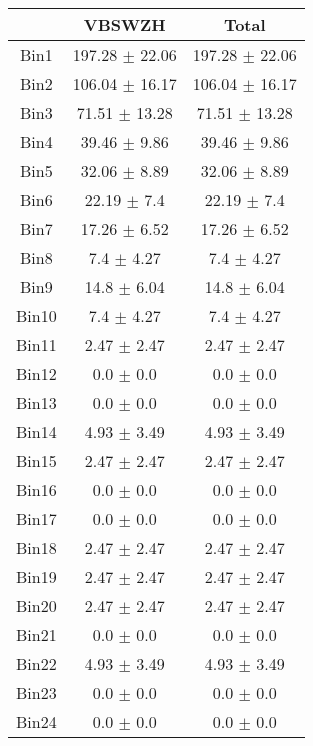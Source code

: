   \begin{tabular}{|c|c|c|}
  \hline
      & VBSWZH & Total \\ \cline{1-3} 
     \hline\hline
     Bin1 & 197.28 $\pm$ 22.06 & 197.28 $\pm$ 22.06 \\ \cline{1-3} 
     Bin2 & 106.04 $\pm$ 16.17 & 106.04 $\pm$ 16.17 \\ \cline{1-3} 
     Bin3 & 71.51 $\pm$ 13.28 & 71.51 $\pm$ 13.28 \\ \cline{1-3} 
     Bin4 & 39.46 $\pm$ 9.86 & 39.46 $\pm$ 9.86 \\ \cline{1-3} 
     Bin5 & 32.06 $\pm$ 8.89 & 32.06 $\pm$ 8.89 \\ \cline{1-3} 
     Bin6 & 22.19 $\pm$ 7.4 & 22.19 $\pm$ 7.4 \\ \cline{1-3} 
     Bin7 & 17.26 $\pm$ 6.52 & 17.26 $\pm$ 6.52 \\ \cline{1-3} 
     Bin8 & 7.4 $\pm$ 4.27 & 7.4 $\pm$ 4.27 \\ \cline{1-3} 
     Bin9 & 14.8 $\pm$ 6.04 & 14.8 $\pm$ 6.04 \\ \cline{1-3} 
     Bin10 & 7.4 $\pm$ 4.27 & 7.4 $\pm$ 4.27 \\ \cline{1-3} 
     Bin11 & 2.47 $\pm$ 2.47 & 2.47 $\pm$ 2.47 \\ \cline{1-3} 
     Bin12 & 0.0 $\pm$ 0.0 & 0.0 $\pm$ 0.0 \\ \cline{1-3} 
     Bin13 & 0.0 $\pm$ 0.0 & 0.0 $\pm$ 0.0 \\ \cline{1-3} 
     Bin14 & 4.93 $\pm$ 3.49 & 4.93 $\pm$ 3.49 \\ \cline{1-3} 
     Bin15 & 2.47 $\pm$ 2.47 & 2.47 $\pm$ 2.47 \\ \cline{1-3} 
     Bin16 & 0.0 $\pm$ 0.0 & 0.0 $\pm$ 0.0 \\ \cline{1-3} 
     Bin17 & 0.0 $\pm$ 0.0 & 0.0 $\pm$ 0.0 \\ \cline{1-3} 
     Bin18 & 2.47 $\pm$ 2.47 & 2.47 $\pm$ 2.47 \\ \cline{1-3} 
     Bin19 & 2.47 $\pm$ 2.47 & 2.47 $\pm$ 2.47 \\ \cline{1-3} 
     Bin20 & 2.47 $\pm$ 2.47 & 2.47 $\pm$ 2.47 \\ \cline{1-3} 
     Bin21 & 0.0 $\pm$ 0.0 & 0.0 $\pm$ 0.0 \\ \cline{1-3} 
     Bin22 & 4.93 $\pm$ 3.49 & 4.93 $\pm$ 3.49 \\ \cline{1-3} 
     Bin23 & 0.0 $\pm$ 0.0 & 0.0 $\pm$ 0.0 \\ \cline{1-3} 
     Bin24 & 0.0 $\pm$ 0.0 & 0.0 $\pm$ 0.0 \\ \cline{1-3} 

\end{tabular}
